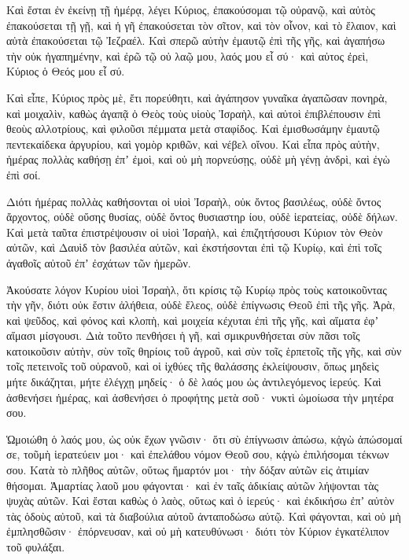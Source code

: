 \begin{spacing}{1.1}
\begin{multicols}{2}
Καὶ ἔσται ἐν ἐκείνῃ τῇ ἡμέρᾳ, λέγει Κύριος, ἐπακούσομαι τῷ οὐρανῷ, καὶ αὐτὸς ἐπακούσεται τῇ γῇ,
καὶ ἡ γῆ ἐπακούσεται τὸν σῖτον, καὶ τὸν οἶνον, καὶ τὸ ἔλαιον, καὶ αὐτὰ ἐπακούσεται τῷ Ἰεζραέλ.
Καὶ σπερῶ αὐτὴν ἐμαυτῷ ἐπὶ τῆς γῆς, καὶ ἀγαπήσω τὴν οὐκ ἠγαπημένην, καὶ ἐρῶ τῷ οὐ λαῷ μου, λαός μου εἶ σύ· καὶ αὐτος ἐρεὶ, Κύριος ὁ Θεός μου εἶ σύ.

Καὶ εἶπε, Κύριος πρὸς μὲ, ἔτι πορεύθητι, καὶ ἀγάπησον γυναῖκα ἀγαπῶσαν πονηρὰ, καὶ μοιχαλὶν, καθὼς ἀγαπᾷ ὁ Θεὸς τοὺς υἱοὺς Ἰσραὴλ, καὶ αὐτοὶ ἐπιβλέπουσιν ἐπὶ θεοὺς αλλοτρίους, καὶ φιλοῦσι πέμματα μετὰ σταφίδος.
Καὶ ἐμισθωσάμην ἐμαυτῷ πεντεκαίδεκα ἀργυρίου, καὶ γομὸρ κριθῶν, καὶ νέβελ οἴνου.
Καὶ εἶπα πρὸς αὐτὴν, ἡμέρας πολλὰς καθήσῃ ἐπʼ ἐμοὶ, καὶ οὐ μὴ πορνεύσῃς, οὐδὲ μὴ γένῃ ἀνδρὶ, καὶ ἐγὼ ἐπὶ σοί.

Διότι ἡμέρας πολλὰς καθήσονται οἱ υἱοὶ Ἰσραὴλ, οὐκ ὄντος βασιλέως, οὐδὲ ὄντος ἄρχοντος, οὐδὲ οὔσης θυσίας, οὐδὲ ὄντος θυσιαστηρ ίου, οὐδὲ ἱερατείας, οὐδὲ δήλων.
Καὶ μετὰ ταῦτα ἐπιστρέψουσιν οἱ υἱοὶ Ἰσραὴλ, καὶ ἐπιζητήσουσι Κύριον τὸν Θεὸν αὐτῶν, καὶ Δαυὶδ τὸν βασιλέα αὐτῶν, καὶ ἐκστήσονται ἐπὶ τῷ Κυρίῳ, καὶ ἐπὶ τοῖς ἀγαθοῖς αὐτοῦ ἐπʼ ἐσχάτων τῶν ἡμερῶν.

Ἀκούσατε λόγον Κυρίου υἱοὶ Ἰσραὴλ, ὅτι κρίσις τῷ Κυρίῳ πρὸς τοὺς κατοικοῦντας τὴν γῆν, διότι οὐκ ἔστιν ἀλήθεια, οὐδὲ ἔλεος, οὐδὲ ἐπίγνωσις Θεοῦ ἐπὶ τῆς γῆς.
Ἀρὰ, καὶ ψεῦδος, καὶ φόνος καὶ κλοπὴ, καὶ μοιχεία κέχυται ἐπὶ τῆς γῆς, καὶ αἵματα ἐφʼ αἵμασι μίσγουσι.
Διὰ τοῦτο πενθήσει ἡ γῆ, καὶ σμικρυνθήσεται σὺν πᾶσι τοῖς κατοικοῦσιν αὐτὴν, σὺν τοῖς θηρίοις τοῦ ἀγροῦ, καὶ σὺν τοῖς ἑρπετοῖς τῆς γῆς, καὶ σὺν τοῖς πετεινοῖς τοῦ οὐρανοῦ, καὶ οἱ ἰχθύες τῆς θαλάσσης ἐκλείψουσιν,
ὅπως μηδεὶς μήτε δικάζηται, μήτε ἐλέγχῃ μηδείς· ὁ δὲ λαός μου ὡς ἀντιλεγόμενος ἱερεύς.
Καὶ ἀσθενήσει ἡμέρας, καὶ ἀσθενήσει ὁ προφήτης μετὰ σοῦ· νυκτὶ ὡμοίωσα τὴν μητέρα σου.

Ὡμοιώθη ὁ λαός μου, ὡς οὐκ ἔχων γνῶσιν· ὅτι σὺ ἐπίγνωσιν ἀπώσω, κᾀγὼ ἀπώσομαί σε, τοῦμὴ ἱερατεύειν μοι· καὶ ἐπελάθου νόμον Θεοῦ σου, κᾀγὼ ἐπιλήσομαι τέκνων σου.
Κατὰ τὸ πλῆθος αὐτῶν, οὕτως ἥμαρτόν μοι· τὴν δόξαν αὐτῶν εἰς ἀτιμίαν θήσομαι.
Ἁμαρτίας λαοῦ μου φάγονται· καὶ ἐν ταῖς ἀδικίαις αὐτῶν λήψονται τὰς ψυχὰς αὐτῶν.
Καὶ ἔσται καθὼς ὁ λαὸς, οὕτως καὶ ὁ ἱερεύς· καὶ ἐκδικήσω ἐπʼ αὐτὸν τὰς ὁδοὺς αὐτοῦ, καὶ τὰ διαβούλια αὐτοῦ ἀνταποδώσω αὐτῷ.
Καὶ φάγονται, καὶ οὐ μὴ ἐμπλησθῶσιν· ἐπόρνευσαν, καὶ οὐ μὴ κατευθύνωσι· διότι τὸν Κύριον ἐγκατέλιπον τοῦ φυλάξαι.


\end{multicols}
\end{spacing}
